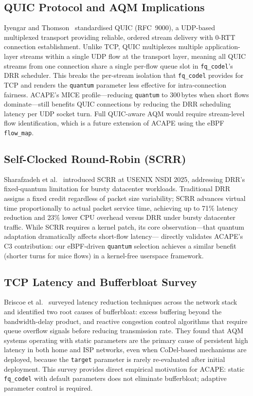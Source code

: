 \documentclass[conference]{IEEEtran}
\begin{document}
\subsection{QUIC Protocol and AQM Implications}

Iyengar and Thomson~\cite{iyengar2021} standardised QUIC (RFC~9000), a
UDP-based multiplexed transport providing reliable, ordered stream delivery
with 0-RTT connection establishment. Unlike TCP, QUIC multiplexes multiple
application-layer streams within a single UDP flow at the transport layer,
meaning all QUIC streams from one connection share a single per-flow queue
slot in \texttt{fq\_codel}'s DRR scheduler. This breaks the per-stream
isolation that \texttt{fq\_codel} provides for TCP and renders the
\texttt{quantum} parameter less effective for intra-connection fairness. ACAPE's
MICE profile---reducing \texttt{quantum} to 300\,bytes when short flows
dominate---still benefits QUIC connections by reducing the DRR scheduling
latency per UDP socket turn. Full QUIC-aware AQM would require stream-level
flow identification, which is a future extension of ACAPE using the eBPF
\texttt{flow\_map}.

\subsection{Self-Clocked Round-Robin (SCRR)}

Sharafzadeh et al.~\cite{scrr2025} introduced SCRR at USENIX NSDI 2025,
addressing DRR's fixed-quantum limitation for bursty datacenter workloads.
Traditional DRR assigns a fixed credit regardless of packet size variability;
SCRR advances virtual time proportionally to actual packet service time,
achieving up to 71\% latency reduction and 23\% lower CPU overhead versus DRR
under bursty datacenter traffic. While SCRR requires a kernel patch, its core
observation---that quantum adaptation dramatically affects short-flow latency---
directly validates ACAPE's C3 contribution: our eBPF-driven \texttt{quantum}
selection achieves a similar benefit (shorter turns for mice flows) in a
kernel-free userspace framework.

\subsection{TCP Latency and Bufferbloat Survey}

Briscoe et al.~\cite{briscoe2016} surveyed latency reduction techniques across
the network stack and identified two root causes of bufferbloat: excess buffering
beyond the bandwidth-delay product, and reactive congestion control algorithms
that require queue overflow signals before reducing transmission rate. They
found that AQM systems operating with static parameters are the primary cause
of persistent high latency in both home and ISP networks, even when CoDel-based
mechanisms are deployed, because the \texttt{target} parameter is rarely
re-evaluated after initial deployment. This survey provides direct empirical
motivation for ACAPE: static \texttt{fq\_codel} with default parameters does
not eliminate bufferbloat; adaptive parameter control is required.
\end{document}
